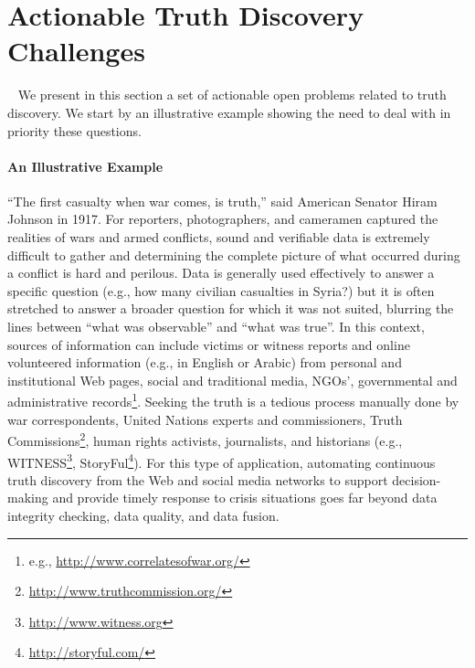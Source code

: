 \documentclass[prodmode,acmtecs]{acmsmall} %
\begin{document}
  
  
  


 
\section{Actionable Truth Discovery Challenges}~\label{sect:challenges-solutions}
We present in this section a set of actionable open problems related to truth discovery. We start by an illustrative
example showing the need to deal with in priority these questions.
\paragraph*{ An Illustrative Example}


``The first casualty when war comes, is truth,'' said American Senator Hiram Johnson in 1917. 
For reporters, photographers, and cameramen captured the realities of wars and armed conflicts, sound 
and verifiable data is extremely difficult to gather and determining the complete picture of what 
occurred during a conflict is hard and perilous. Data is generally used effectively to answer a specific 
question (e.g., how many civilian casualties in Syria?) but it is often stretched to answer a broader question
for which it was not suited, blurring the lines between ``what was observable'' and  ``what was true''. In this context, 
sources of information can include victims or witness reports  and online volunteered information (e.g., in English or Arabic) 
from personal and institutional Web pages, social and traditional media, NGOs', governmental and administrative records\footnote{\scriptsize{e.g., \url{http://www.correlatesofwar.org/}}}. 
Seeking the truth is a tedious process manually done by war correspondents, United Nations experts and commissioners, Truth 
Commissions\footnote{\scriptsize{\url{ http://www.truthcommission.org/}}}, human rights activists, journalists, and historians (e.g., WITNESS\footnote{\scriptsize{\url{http://www.witness.org}}}, StoryFul\footnote{\scriptsize{\url{http://storyful.com/}}}). 
For this type of application, automating continuous truth discovery from the Web and social media networks to support decision-making 
and provide timely response to crisis situations goes far beyond data integrity checking, data quality, and data fusion. 
\end{document}
